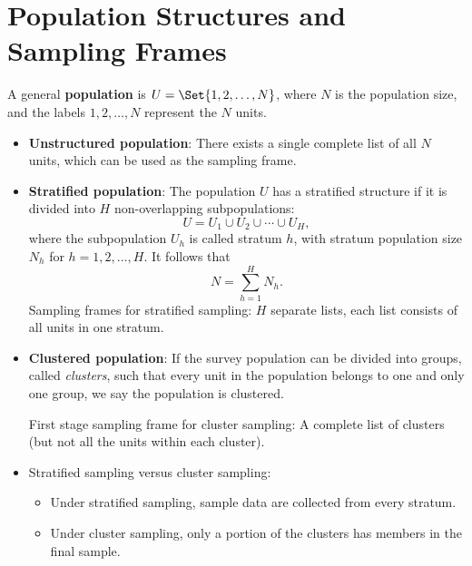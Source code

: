 \documentclass[oneside]{book}\usepackage[]{graphicx}\usepackage[svgnames]{xcolor}
\begin{document}
\section*{Population Structures and Sampling Frames}
\begin{Regular}{}
      A general \textbf{population} is $ U=\Set{1,2,\ldots,N} $,
      where $ N $ is the population size, and the labels $ 1,2,\ldots,N $ represent
      the $ N $ units.
      \tcblower{}
      \begin{itemize}
            \item \textbf{Unstructured population}:
                  There exists a single complete list of all $N$ units, which can be
                  used as the sampling frame.
            \item \textbf{Stratified population}:
                  The population $U$ has a stratified structure if it is divided into $H$
                  non-overlapping subpopulations:
                  \[ U=U_1\cup U_2\cup\cdots\cup U_H, \]
                  where the subpopulation $ U_h $ is called stratum $ h $, with stratum
                  population size $ N_h $ for $ h=1,2,\ldots,H $. It follows that
                  \[ N=\sum_{h=1}^{H}N_h. \]
                  Sampling frames for stratified sampling:
                  $H$ separate lists, each list consists of all units in one stratum.
            \item \textbf{Clustered population}:
                  If the survey population can be divided into groups, called
                  \emph{clusters}, such that every unit in the population belongs to one
                  and only one group, we say the population is clustered.

                  First stage sampling frame for cluster sampling: A complete list of clusters (but not all the units within each
                  cluster).
            \item Stratified sampling versus cluster sampling:
                  \begin{itemize}
                        \item Under stratified sampling, sample data are collected from every
                              stratum.
                        \item Under cluster sampling, only a portion of the clusters has
                              members in the final sample.
                  \end{itemize}
      \end{itemize}
\end{Regular}
\end{document}
